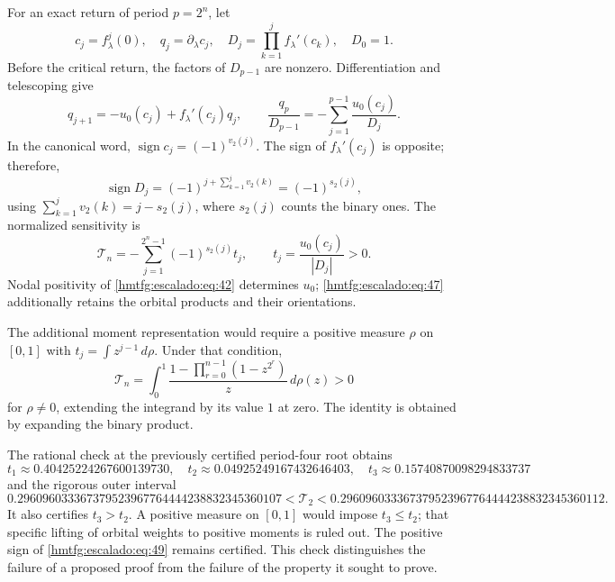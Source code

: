 For an exact return of period \(p=2^n\), let
\[
c_j=f_\lambda^j(0),\quad q_j=\partial_\lambda c_j,\quad
D_j=\prod_{k=1}^j f_\lambda'(c_k),\quad D_0=1.
\]
Before the critical return, the factors of \(D_{p-1}\) are nonzero. Differentiation and telescoping give
\begin{equation}
q_{j+1}=-u_0(c_j)+f_\lambda'(c_j)q_j,\qquad
\boxed{\frac{q_p}{D_{p-1}}
=-\sum_{j=1}^{p-1}\frac{u_0(c_j)}{D_j}.}
\label{hmtfg:escalado:eq:45}
\end{equation}
In the canonical word, \(\operatorname{sign}c_j=(-1)^{v_2(j)}\). The sign of \(f_\lambda'(c_j)\) is opposite; therefore,
\begin{equation}
\operatorname{sign}D_j=(-1)^{j+\sum_{k=1}^jv_2(k)}
=(-1)^{s_2(j)},
\label{hmtfg:escalado:eq:46}
\end{equation}
using \(\sum_{k=1}^jv_2(k)=j-s_2(j)\), where \(s_2(j)\) counts the binary ones. The normalized sensitivity is
\begin{equation}
\mathcal T_n=-\sum_{j=1}^{2^n-1}(-1)^{s_2(j)}t_j,\qquad
t_j=\frac{u_0(c_j)}{|D_j|}>0.
\label{hmtfg:escalado:eq:47}
\end{equation}
Nodal positivity of \eqref{hmtfg:escalado:eq:42} determines \(u_0\); \eqref{hmtfg:escalado:eq:47} additionally retains the orbital products and their orientations.

The additional moment representation would require a positive measure \(\rho\) on \([0,1]\) with \(t_j=\int z^{j-1}\,d\rho\). Under that condition,
\begin{equation}
\mathcal T_n=\int_0^1
\frac{1-\prod_{r=0}^{n-1}(1-z^{2^r})}{z}\,d\rho(z)>0
\label{hmtfg:escalado:eq:48}
\end{equation}
for \(\rho\ne0\), extending the integrand by its value \(1\) at zero. The identity is obtained by expanding the binary product.

The rational check at the previously certified period-four root obtains
\[
t_1\approx0.40425224267600139730,\quad
t_2\approx0.04925249167432646403,\quad
t_3\approx0.15740870098294833737
\]
and the rigorous outer interval
\begin{equation}
0.296096033367379523967764444238832345360107
<\mathcal T_2<
0.296096033367379523967764444238832345360112.
\label{hmtfg:escalado:eq:49}
\end{equation}
It also certifies \(t_3>t_2\). A positive measure on \([0,1]\) would impose \(t_3\le t_2\); that specific lifting of orbital weights to positive moments is ruled out. The positive sign of \eqref{hmtfg:escalado:eq:49} remains certified. This check distinguishes the failure of a proposed proof from the failure of the property it sought to prove.

